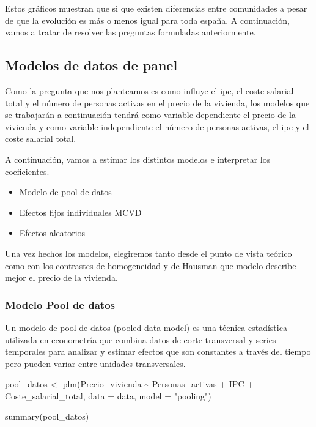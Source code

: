 \documentclass[
]{article}
\newenvironment{Shaded}{\begin{snugshade}}{\end{snugshade}}
\newcommand{\AttributeTok}[1]{\textcolor[rgb]{0.77,0.63,0.00}{#1}}
\newcommand{\FunctionTok}[1]{\textcolor[rgb]{0.00,0.00,0.00}{#1}}
\newcommand{\NormalTok}[1]{#1}
\newcommand{\OtherTok}[1]{\textcolor[rgb]{0.56,0.35,0.01}{#1}}
\newcommand{\SpecialCharTok}[1]{\textcolor[rgb]{0.00,0.00,0.00}{#1}}
\newcommand{\StringTok}[1]{\textcolor[rgb]{0.31,0.60,0.02}{#1}}
\providecommand{\tightlist}{%
  \setlength{\itemsep}{0pt}\setlength{\parskip}{0pt}}
\begin{document}
Estos gráficos muestran que si que existen diferencias entre comunidades
a pesar de que la evolución es más o menos igual para toda españa. A
continuación, vamos a tratar de resolver las preguntas formuladas
anteriormente.

\hypertarget{modelos-de-datos-de-panel}{%
\subsection{Modelos de datos de panel}\label{modelos-de-datos-de-panel}}

Como la pregunta que nos planteamos es como influye el ipc, el coste
salarial total y el número de personas activas en el precio de la
vivienda, los modelos que se trabajarán a continuación tendrá como
variable dependiente el precio de la vivienda y como variable
independiente el número de personas activas, el ipc y el coste salarial
total.

A continuación, vamos a estimar los distintos modelos e interpretar los
coeficientes.

\begin{itemize}
\tightlist
\item
  Modelo de pool de datos
\item
  Efectos fijos individuales MCVD
\item
  Efectos aleatorios
\end{itemize}

Una vez hechos los modelos, elegiremos tanto desde el punto de vista
teórico como con los contrastes de homogeneidad y de Hausman que modelo
describe mejor el precio de la vivienda.

\hypertarget{modelo-pool-de-datos}{%
\subsubsection{Modelo Pool de datos}\label{modelo-pool-de-datos}}

Un modelo de pool de datos (pooled data model) es una técnica
estadística utilizada en econometría que combina datos de corte
transversal y series temporales para analizar y estimar efectos que son
constantes a través del tiempo pero pueden variar entre unidades
transversales.

\begin{Shaded}
\begin{Highlighting}[]
\NormalTok{pool\_datos }\OtherTok{\textless{}{-}} \FunctionTok{plm}\NormalTok{(Precio\_vivienda }\SpecialCharTok{\textasciitilde{}}\NormalTok{ Personas\_activas }\SpecialCharTok{+}\NormalTok{ IPC }\SpecialCharTok{+}\NormalTok{ Coste\_salarial\_total, }\AttributeTok{data =}\NormalTok{ data, }\AttributeTok{model =} \StringTok{"pooling"}\NormalTok{)}

\FunctionTok{summary}\NormalTok{(pool\_datos)}
\end{Highlighting}
\end{Shaded}
\end{document}
